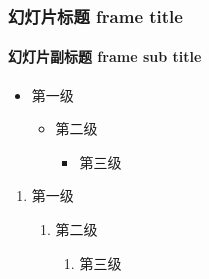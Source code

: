 \documentclass[12pt]{beamer}
\begin{document}
\begin{frame}[t]
    \frametitle{幻灯片标题 frame title}
    \framesubtitle{幻灯片副标题 frame sub title}

    \begin{itemize}
        \item 第一级
        \begin{itemize}
            \item 第二级
            \begin{itemize}
                \item 第三级
            \end{itemize}
        \end{itemize}
    \end{itemize}

    \begin{enumerate}
        \item 第一级
        \begin{enumerate}
            \item 第二级
            \begin{enumerate}
                \item 第三级
            \end{enumerate}
        \end{enumerate}
    \end{enumerate}

\end{frame}
\end{document}
